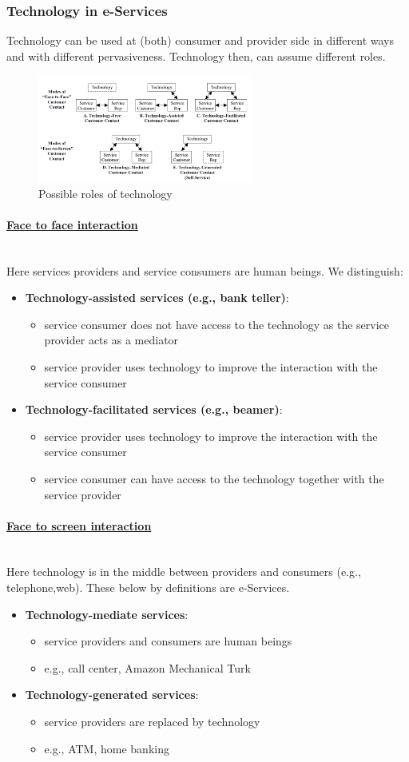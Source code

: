\documentclass[10pt,a4paper]{article}
\newcommand{\myparagraph}[1]{\paragraph{\uline{#1}}\mbox{}\\[0.05in]}
\begin{document}
\subsubsection{Technology in e-Services}
Technology can be used at (both) consumer and provider side in different ways and with different pervasiveness. Technology then, can assume different roles.
\begin{figure}[h!]
 \hfill \includegraphics[width=200pt]{images/roles-tech}\hspace*{\fill}
 \caption{Possible roles of technology}
  \label{fig:roles-tech}
\end{figure}
\myparagraph{Face to face interaction}
Here services providers and service consumers are human beings. We distinguish:
\begin{itemize}
	\item \textbf{Technology-assisted services (e.g., bank teller)}:
	\begin{itemize}
		\item service consumer does not have access to the technology as the service provider acts as a mediator
		\item service provider uses technology to improve the interaction with the service consumer
	\end{itemize}
	\item \textbf{Technology-facilitated services (e.g., beamer)}:
		\begin{itemize}
		\item service provider uses technology to improve the interaction with the service consumer
		\item service consumer can have access to the technology together with the service provider
	\end{itemize}
\end{itemize}
\myparagraph{Face to screen interaction}
Here technology is in the middle between providers and consumers (e.g., telephone,web). These below by definitions are e-Services.
\begin{itemize}
	\item \textbf{Technology-mediate services}:
	\begin{itemize}
		\item service providers and consumers are human beings
		\item e.g., call center, Amazon Mechanical Turk
	\end{itemize}
	\item \textbf{Technology-generated services}:
		\begin{itemize}
		\item service providers are replaced by technology
		\item e.g., ATM, home banking
	\end{itemize}
\end{itemize}
\end{document}
